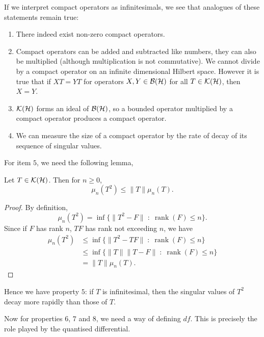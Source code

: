 If we interpret compact operators as infinitesimals, we see that analogues of these statements
remain true:
\begin{enumerate}
    \item{} There indeed exist non-zero compact operators.
    \item{} Compact operators can be added and subtracted like numbers, they can
    also be multiplied (although multiplication is not commutative). We cannot
    divide by a compact operator on an infinite dimensional Hilbert space. However
    it is true that if $XT = YT$ for operators $X,Y \in \mathcal{B}(\mathcal{H})$ for all
    $T \in \mathcal{K}(\mathcal{H})$, then $X = Y$.
    \item{} $\mathcal{K}(\mathcal{H})$ forms an ideal of $\mathcal{B}(\mathcal{H})$, so a bounded
    operator multiplied by a compact operator produces a compact operator.
    \item{} We can measure the size of a compact operator
    by the rate of decay of its sequence of singular values.
\end{enumerate}
For item $5$, we need the following lemma,
\begin{lemma}
    Let $T \in \mathcal{K}(\mathcal{H})$. Then for $n\geq 0$,
    \begin{equation}
        \mu_n(T^2) \leq \|T\|\mu_n(T).
    \end{equation}
\end{lemma}
\begin{proof}
    By definition,
    \begin{equation}
        \mu_n(T^2) = \inf\{\|T^2-F\|\;:\; \operatorname{rank}(F) \leq n\}.
    \end{equation}
    Since if $F$ has rank $n$, $TF$ has rank not exceeding $n$, we have
    \begin{align}
        \mu_n(T^2) &\leq \inf\{\|T^2-TF\|\;:\;\operatorname{rank}(F) \leq n\}\\
                   &\leq \inf\{\|T\|\|T-F\|\;:\;\operatorname{rank}(F) \leq n\}\\
                   &= \|T\|\mu_n(T).
    \end{align}
\end{proof}
Hence we have property $5$: if $T$ is infinitesimal, then the singular values
of $T^2$ decay more rapidly than those of $T$. 

Now for properties $6$, $7$ and $8$, we need a way of defining $df$. This is precisely
the role played by the quantised differential.

